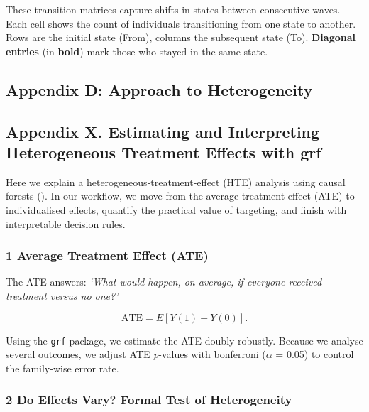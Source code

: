 \documentclass[
  single column]{article}
\begin{document}
These transition matrices capture shifts in states between consecutive
waves. Each cell shows the count of individuals transitioning from one
state to another. Rows are the initial state (From), columns the
subsequent state (To). \textbf{Diagonal entries} (in \textbf{bold}) mark
those who stayed in the same state.

\newpage{}

\subsection{Appendix D: Approach to
Heterogeneity}\label{appendix-cate-validation}

\subsection{\texorpdfstring{Appendix X. Estimating and Interpreting
Heterogeneous Treatment Effects with
\textbf{grf}}{Appendix X. Estimating and Interpreting Heterogeneous Treatment Effects with grf}}\label{appendix-x.-estimating-and-interpreting-heterogeneous-treatment-effects-with-grf}

Here we explain a heterogeneous‐treatment‐effect (HTE) analysis using
causal forests (). In our
workflow, we move from the average treatment effect (ATE) to
individualised effects, quantify the practical value of targeting, and
finish with interpretable decision rules.

\subsubsection{1 Average Treatment Effect
(ATE)}\label{average-treatment-effect-ate}

The ATE answers: \emph{`What would happen, on average, if everyone
received treatment versus no one?'}

\[
    \text{ATE}=E[Y(1)-Y(0)].
\]

Using the \texttt{grf} package, we estimate the ATE doubly-robustly.
Because we analyse several outcomes, we adjust ATE \emph{p}-values with
bonferroni (\(\alpha\) = 0.05) to control the family-wise error rate.

\subsubsection{2 Do Effects Vary? Formal Test of
Heterogeneity}\label{do-effects-vary-formal-test-of-heterogeneity}
\end{document}
